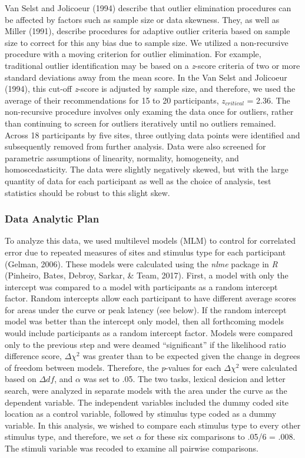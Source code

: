 \documentclass[english,man]{apa6}
\theoremstyle{definition}
\theoremstyle{definition}
\theoremstyle{definition}
\theoremstyle{remark}
\begin{document}
Van Selst and Jolicoeur (1994) describe that outlier elimination
procedures can be affected by factors such as sample size or data
skewness. They, as well as Miller (1991), describe procedures for
adaptive outlier criteria based on sample size to correct for this any
bias due to sample size. We utilized a non-recursive procedure with a
moving criterion for outlier elimination. For example, traditional
outlier identification may be based on a \emph{z}-score criteria of two
or more standard deviations away from the mean score. In the Van Selst
and Jolicoeur (1994), this cut-off \emph{z}-score is adjusted by sample
size, and therefore, we used the average of their recommendations for 15
to 20 participants, \(z_{critical}\) = 2.36. The non-recursive procedure
involves only examing the data once for outliers, rather than continuing
to screen for outliers iteratively until no outliers remained. Across 18
participants by five sites, three outlying data points were identified
and subsequently removed from further analysis. Data were also screened
for parametric assumptions of linearity, normality, homogeneity, and
homoscedasticity. The data were slightly negatively skewed, but with the
large quantity of data for each participant as well as the choice of
analysis, test statistics should be robust to this slight skew.

\subsubsection{Data Analytic Plan}\label{data-analytic-plan}

To analyze this data, we used multilevel models (MLM) to control for
correlated error due to repeated measures of sites and stimulus type for
each participant (Gelman, 2006). These models were calculated using the
\emph{nlme} package in \emph{R} (Pinheiro, Bates, Debroy, Sarkar, \&
Team, 2017). First, a model with only the intercept was compared to a
model with participants as a random intercept factor. Random intercepts
allow each participant to have different average scores for areas under
the curve or peak latency (see below). If the random intercept model was
better than the intercept only model, then all forthcoming models would
include participants as a random intercept factor. Models were compared
only to the previous step and were deamed \enquote{significant} if the
likelihood ratio difference score, \(\Delta\chi^2\) was greater than to
be expected given the change in degrees of freedom between models.
Therefore, the \emph{p}-values for each \(\Delta\chi^2\) were calculated
based on \(\Delta df\), and \(\alpha\) was set to .05. The two tasks,
lexical desicion and letter search, were analyzed in separate models
with the area under the curve as the dependent variable. The independent
variables included the dummy coded site location as a control variable,
followed by stimulus type coded as a dummy variable. In this analysis,
we wished to compare each stimulus type to every other stimulus type,
and therefore, we set \(\alpha\) for these six comparisons to .05/6 =
.008. The stimuli variable was recoded to examine all pairwise
comparisons.
\end{document}
